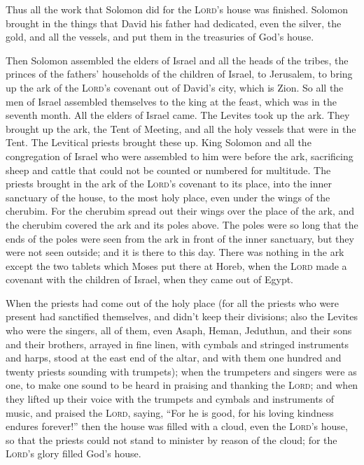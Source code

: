  Thus all the work that Solomon did for the
\textsc{Lord}'s house was finished. Solomon brought in the things that
David his father had dedicated, even the silver, the gold, and all the
vessels, and put them in the treasuries of God's house.

 Then Solomon assembled the elders of Israel and all the
heads of the tribes, the princes of the fathers' households of the
children of Israel, to Jerusalem, to bring up the ark of the
\textsc{Lord}'s covenant out of David's city, which is Zion.
 So all the men of Israel assembled themselves to the king
at the feast, which was in the seventh month.  All the
elders of Israel came. The Levites took up the ark.  They
brought up the ark, the Tent of Meeting, and all the holy vessels that
were in the Tent. The Levitical priests brought these up. 
King Solomon and all the congregation of Israel who were assembled to
him were before the ark, sacrificing sheep and cattle that could not be
counted or numbered for multitude.  The priests brought in
the ark of the \textsc{Lord}'s covenant to its place, into the inner
sanctuary of the house, to the most holy place, even under the wings of
the cherubim.  For the cherubim spread out their wings
over the place of the ark, and the cherubim covered the ark and its
poles above.  The poles were so long that the ends of the
poles were seen from the ark in front of the inner sanctuary, but they
were not seen outside; and it is there to this day. 
There was nothing in the ark except the two tablets which Moses put
there at Horeb, when the \textsc{Lord} made a covenant with the children
of Israel, when they came out of Egypt.

 When the priests had come out of the holy place (for all
the priests who were present had sanctified themselves, and didn't keep
their divisions;  also the Levites who were the singers,
all of them, even Asaph, Heman, Jeduthun, and their sons and their
brothers, arrayed in fine linen, with cymbals and stringed instruments
and harps, stood at the east end of the altar, and with them one hundred
and twenty priests sounding with trumpets);  when the
trumpeters and singers were as one, to make one sound to be heard in
praising and thanking the \textsc{Lord}; and when they lifted up their
voice with the trumpets and cymbals and instruments of music, and
praised the \textsc{Lord}, saying, ``For he is good, for his loving
kindness endures forever!'' then the house was filled with a cloud, even
the \textsc{Lord}'s house,  so that the priests could not
stand to minister by reason of the cloud; for the \textsc{Lord}'s glory
filled God's house.

